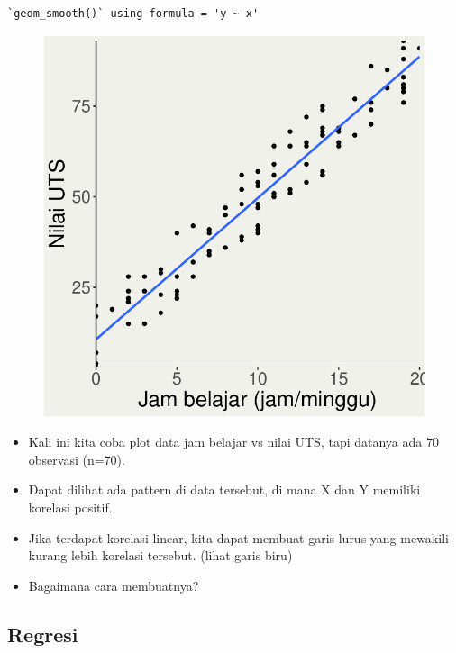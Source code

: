 \documentclass[
  letterpaper,
  DIV=11,
  numbers=noendperiod]{scrartcl}
\begin{document}
\begin{verbatim}
`geom_smooth()` using formula = 'y ~ x'
\end{verbatim}

\begin{figure}[H]

{\centering \includegraphics{index_files/figure-pdf/unnamed-chunk-21-1.pdf}

}

\end{figure}

\begin{itemize}
\item
  Kali ini kita coba plot data jam belajar vs nilai UTS, tapi datanya
  ada 70 observasi (n=70).
\item
  Dapat dilihat ada pattern di data tersebut, di mana X dan Y memiliki
  korelasi positif.
\item
  Jika terdapat korelasi linear, kita dapat membuat garis lurus yang
  mewakili kurang lebih korelasi tersebut. (lihat garis biru)
\item
  Bagaimana cara membuatnya?
\end{itemize}

\hypertarget{regresi-2}{%
\subsection{Regresi}\label{regresi-2}}
\end{document}
